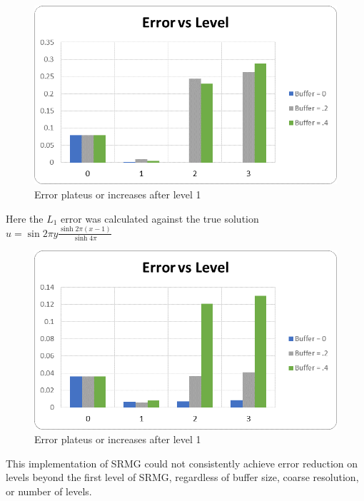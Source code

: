 \documentclass[final]{siamart1116}
\numberwithin{theorem}{section}
\begin{document}
\begin{figure}[h]
\begin{center}
  \includegraphics[scale=.5]{convergencechebsinsin.png}
  \caption{Error plateus or increases after level 1}
\end{center}
\end{figure}



Here the $L_1$ error was calculated against the true solution $u = \sin{2\pi y}\frac{\sinh{2 \pi (x-1)} }{\sinh{4\pi}}$

\begin{figure}[H]
\begin{center}
  \includegraphics[scale=.5]{convergencechebsinhsin.png}
  \caption{Error plateus or increases after level 1}
\end{center}
\end{figure}


This implementation of SRMG could not consistently achieve error reduction on levels beyond the first level of SRMG, regardless of buffer size, coarse resolution, or number of levels. 
\end{document}
